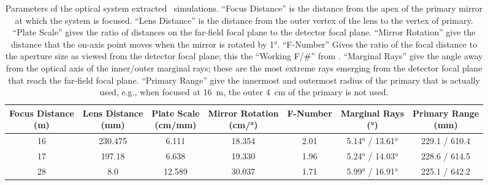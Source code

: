\begin{table}
\centering
\caption{
  Parameters of the optical system extracted \ZEMAX\ simulations.
  ``Focus Distance'' is the distance from the apex of the primary mirror at which the system is focused.
  ``Lens Distance'' is the distance from the outer vertex of the lens to the vertex of primary.
  ``Plate Scale'' gives the ratio of distances on the far-field focal plane to the detector focal plane.
  ``Mirror Rotation'' give the distance that the on-axis point moves when the mirror is rotated by \ang{1}.
  ``F-Number'' Gives the ratio of the focal distance to the aperture size as viewed from the detector focal plane; this the ``Working F/\#'' from \ZEMAX.
  ``Marginal Rays'' give the angle away from the optical axis of the inner/outer marginal rays; these are the most extreme rays emerging from the detector focal plane that reach the far-field focal plane.
  ``Primary Range'' give the innermost and outermost radius of the primary that is actually used, e.g., when focused at \SI{16}{\m}, the outer \SI{4}{\cm} of the primary is not used.
}
\label{tab:ch4-zemax-parms}
\begin{tabular}{ccccccc}
\toprule
  \specialcell{Focus Distance \\ (\si{\m})} &
  \specialcell{Lens Distance \\ (\si{\mm})} &
  \specialcell{Plate Scale \\ (\si{\cm}/\si{\mm})} &
  \specialcell{Mirror Rotation \\ (\si{\cm}/\si{\degree})} &
  \specialcell{F-Number  \\ } & 
  \specialcell{Marginal Rays \\ (\si{\degree})} &
  \specialcell{Primary Range \\ (\si{\mm})} \\
\midrule
16 & 230.475 &  6.111 & 18.354 & 2.01 &  \ang{5.14} / \ang{13.61} & 229.1 / 610.4 \\
17 & 197.18  &  6.638 & 19.330 & 1.96 &  \ang{5.24} / \ang{14.03} & 228.6 / 614.5 \\ 
28 &   8.0   & 12.589 & 30.037 & 1.71 &  \ang{5.99} / \ang{16.91} & 225.1 / 642.2 \\
\bottomrule
\end{tabular}
\end{table}

